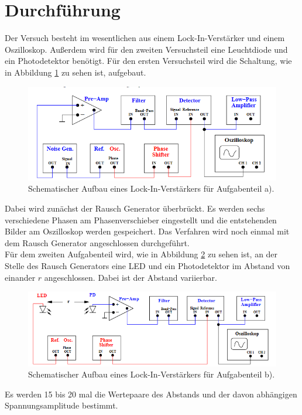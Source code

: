\section{Durchführung}
\label{sec:Durchführung}
Der Versuch besteht im wesentlichen aus einem Lock-In-Verstärker und einem Oszilloskop. Außerdem wird für den zweiten Versuchsteil eine Leuchtdiode und ein Photodetektor benötigt.
Für den ersten Versuchsteil wird die Schaltung, wie in Abbildung \ref{fig:aufa} zu sehen ist, aufgebaut.
\begin{figure}
    \centering
    \caption{Schematischer Aufbau eines Lock-In-Verstärkers für Aufgabenteil a).\cite{v303}}
    \label{fig:aufa}
    \includegraphics[width = 0.6 \textwidth]{pics/aufa.png}
\end{figure}
Dabei wird zunächst der Rausch Generator überbrückt. Es werden sechs verschiedene Phasen am Phasenverschieber eingestellt und die entstehenden
Bilder am Oszilloskop werden gespeichert. Das Verfahren wird noch einmal mit dem Rausch Generator angeschlossen durchgeführt.
\\
Für dem zweiten Aufgabenteil wird, wie in Abbildung \ref{fig:aufb} zu sehen ist, an der Stelle des Rausch Generators eine LED und ein Photodetektor im Abstand von einander $r$ angeschlossen.
Dabei ist der Abstand variierbar. 
\begin{figure}
    \centering
    \caption{Schematischer Aufbau eines Lock-In-Verstärkers für Aufgabenteil b).\cite{v303}}
    \label{fig:aufb}
    \includegraphics[width = 0.6 \textwidth]{pics/aufb.png}
\end{figure}
Es werden 15 bis 20 mal die Wertepaare des Abstands und der davon abhängigen Spannungsamplitude bestimmt.